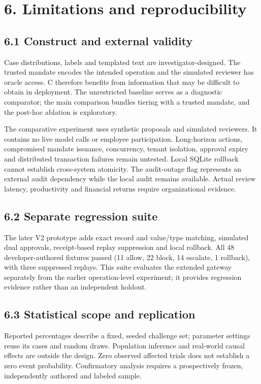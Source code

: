 \documentclass[11pt,letterpaper]{article}
\begin{document}
\section*{6. Limitations and reproducibility}
\subsection*{6.1 Construct and external validity}
Case distributions, labels and templated text are investigator-designed. The trusted mandate encodes the intended operation and the simulated reviewer has oracle access. C therefore benefits from information that may be difficult to obtain in deployment. The unrestricted baseline serves as a diagnostic comparator; the main comparison bundles tiering with a trusted mandate, and the post-hoc ablation is exploratory.

The comparative experiment uses synthetic proposals and simulated reviewers. It contains no live model calls or employee participation. Long-horizon actions, compromised mandate issuance, concurrency, tenant isolation, approval expiry and distributed transaction failures remain untested. Local SQLite rollback cannot establish cross-system atomicity. The audit-outage flag represents an external audit dependency while the local audit remains available. Actual review latency, productivity and financial returns require organizational evidence.

\subsection*{6.2 Separate regression suite}
The later V2 prototype adds exact record and value/type matching, simulated dual approvals, receipt-based replay suppression and local rollback. All 48 developer-authored fixtures passed (11 allow, 22 block, 14 escalate, 1 rollback), with three suppressed replays. This suite evaluates the extended gateway separately from the earlier operation-level experiment; it provides regression evidence rather than an independent holdout.

\subsection*{6.3 Statistical scope and replication}
Reported percentages describe a fixed, seeded challenge set; parameter settings reuse its cases and random draws. Population inference and real-world causal effects are outside the design. Zero observed affected trials does not establish a zero event probability. Confirmatory analysis requires a prospectively frozen, independently authored and labeled sample.
\end{document}
